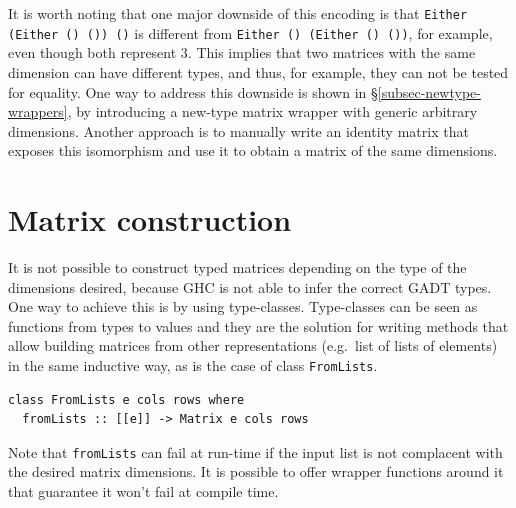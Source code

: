 \documentclass[sigplan]{acmart}\settopmatter{}
\newcommand{\hs}{\texttt}
\def\doc{paper}
\begin{document}
It is worth noting that one major downside of this encoding is that \hs{Either (Either () ()) ()} is different from \hs{Either () (Either () ())}, for example, even though both represent $3$. This implies that two matrices with the same dimension can have different types, and thus, for example, they can not be tested for equality. One way to address this downside is shown in \S\ref{subsec-newtype-wrappers}, by introducing a new-type matrix wrapper with generic arbitrary dimensions. Another approach is to manually write an identity matrix that exposes this isomorphism and use it to obtain a matrix of the same dimensions.  

\section{Matrix construction}\label{l-m-s}

It is not possible to construct typed matrices depending on the type of the dimensions desired, because GHC is not able to infer the correct GADT types. One way to achieve this is by using type-classes. Type-classes can be seen as functions from types to values and they are the solution for writing methods that allow building matrices from other representations (e.g.\ list of lists of elements) in the same inductive way, as is the case of class \hs{FromLists}.
\begin{verbatim}
class FromLists e cols rows where
  fromLists :: [[e]] -> Matrix e cols rows
\end{verbatim}
\noindent %
Note that \hs{fromLists} can fail at run-time if the input list is not complacent with the desired matrix dimensions. It is possible to offer wrapper functions around it that guarantee it won't fail at compile time.
\end{document}
